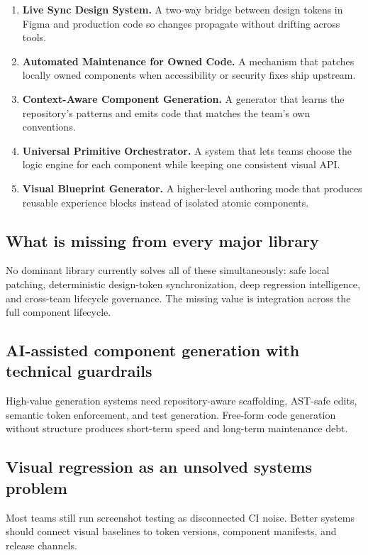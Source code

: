 \documentclass[11pt,twoside,a4paper]{article}
\begin{document}
\begin{enumerate}[leftmargin=*, itemsep=0.55em]
  \item \textbf{Live Sync Design System.} A two-way bridge between design tokens in Figma and production code so changes propagate without drifting across tools.
  \item \textbf{Automated Maintenance for Owned Code.} A mechanism that patches locally owned components when accessibility or security fixes ship upstream.
  \item \textbf{Context-Aware Component Generation.} A generator that learns the repository's patterns and emits code that matches the team's own conventions.
  \item \textbf{Universal Primitive Orchestrator.} A system that lets teams choose the logic engine for each component while keeping one consistent visual API.
  \item \textbf{Visual Blueprint Generator.} A higher-level authoring mode that produces reusable experience blocks instead of isolated atomic components.
\end{enumerate}

\subsection{What is missing from every major library}
No dominant library currently solves all of these simultaneously: safe local patching, deterministic design-token synchronization, deep regression intelligence, and cross-team lifecycle governance. The missing value is integration across the full component lifecycle.

\subsection{AI-assisted component generation with technical guardrails}
High-value generation systems need repository-aware scaffolding, AST-safe edits, semantic token enforcement, and test generation. Free-form code generation without structure produces short-term speed and long-term maintenance debt.

\subsection{Visual regression as an unsolved systems problem}
Most teams still run screenshot testing as disconnected CI noise. Better systems should connect visual baselines to token versions, component manifests, and release channels.
\end{document}
